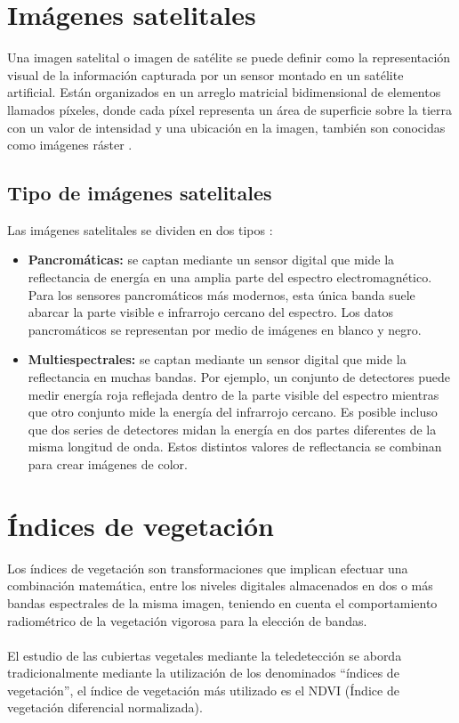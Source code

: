 \section{Im\'agenes satelitales}
Una imagen satelital o imagen de sat\'elite se puede definir como la representaci\'on visual de la informaci\'on capturada por un sensor montado en un sat\'elite artificial. Est\'an organizados en un arreglo matricial bidimensional de elementos llamados p\'ixeles, donde cada p\'ixel representa un \'area de superficie sobre la tierra con un valor de intensidad y una ubicación en la imagen, tambi\'en son conocidas como im\'agenes r\'aster \cite{acosta2003experiencia}. 

\subsection{Tipo de im\'agenes satelitales}
Las im\'agenes satelitales se dividen en dos tipos \cite{salinero2002teledeteccion}:
	\begin{itemize}
		\item \textbf{Pancrom\'aticas:} se captan mediante un sensor digital que mide la reflectancia de energ\'ia en una amplia parte del espectro electromagn\'etico. Para los sensores pancrom\'aticos m\'as modernos, esta \'unica banda suele abarcar la parte visible e infrarrojo cercano del espectro. Los datos pancrom\'aticos se representan por medio de im\'agenes en blanco y negro. 
		\item \textbf{Multiespectrales:} se captan mediante un sensor digital que mide la reflectancia en muchas bandas. Por ejemplo, un conjunto de detectores puede medir energ\'ia roja reflejada dentro de la parte visible del espectro mientras que otro conjunto mide la energ\'ia del infrarrojo cercano. Es posible incluso que dos series de detectores midan la energ\'ia en dos partes diferentes de la misma longitud de onda. Estos distintos valores de reflectancia se combinan para crear im\'agenes de color.

	\end{itemize}
	
\section{\'Indices de vegetaci\'on}
Los \'indices de vegetaci\'on son transformaciones que implican efectuar una combinaci\'on matem\'atica, entre los niveles digitales almacenados en dos o m\'as bandas espectrales de la misma imagen, teniendo en cuenta el comportamiento radiom\'etrico de la vegetaci\'on vigorosa para la elecci\'on de bandas\cite{speranza2005potencialidad}. \\~\\
El estudio de las cubiertas vegetales mediante la teledetecci\'on se aborda tradicionalmente mediante la utilización de los denominados “índices de vegetaci\'on”, el índice de vegetaci\'on m\'as utilizado es el NDVI (\'Indice de vegetaci\'on diferencial normalizada)\cite{sader2000estimacion}.

